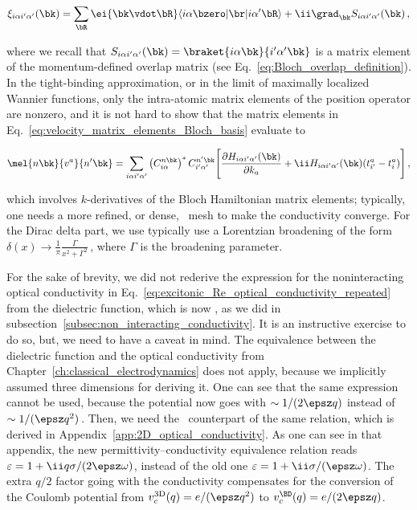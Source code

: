\begin{equation}
    \xi_{i \alpha i' \alpha'}(\bk) = \sum_{\bR} \ei{\bk \vdot \bR} \langle i \alpha \bzero | \br | i \alpha' \bR \rangle + \ii \grad_{\bk} S_{i \alpha i' \alpha '} (\bk) \,,
\end{equation}

\noindent where we recall that $S_{i \alpha i' \alpha '} (\bk) = \braket{i \alpha \bk}{i' \alpha' \bk}$ is a matrix element of the momentum-defined overlap matrix (see Eq.~\ref{eq:Bloch_overlap_definition}).
In the tight-binding approximation, or in the limit of maximally localized Wannier functions, only the intra-atomic matrix elements of the position operator are nonzero, and it is not hard to show that the matrix elements in Eq.~\ref{eq:velocity_matrix_elements_Bloch_basis} evaluate to

\begin{equation}
     \mel{n\bk}{v^{a}}{n'\bk} = \sum_{i \alpha i' \alpha'} \left(C^{n\bk}_{i\alpha}\right)^* C^{n'\bk}_{i'\alpha'}\Bigg[ \frac{\partial H_{i \alpha i' \alpha'}(\bk)}{\partial k_a} +  \ii H_{i \alpha i' \alpha'}(\bk)(t^a_{i'} - t^a_{i})\Bigg] \,,
\end{equation}

\noindent which involves $k$-derivatives of the Bloch Hamiltonian matrix elements; typically, one needs a more refined, or dense, \bz~mesh to make the conductivity converge.
For the Dirac delta part, we use typically use a Lorentzian broadening of the form $\delta (x) \to \frac{1}{\pi} \frac{\Gamma}{x^2 + \Gamma^2}$\,, where $\Gamma$ is the broadening parameter.

For the sake of brevity, we did not rederive the expression for the noninteracting optical conductivity in Eq.~\eqref{eq:excitonic_Re_optical_conductivity_repeated} from the dielectric function, which is now \bd, as we did in subsection~\eqref{subsec:non_interacting_conductivity}.
It is an instructive exercise to do so, but, we need to have a caveat in mind.
The equivalence between the dielectric function and the optical conductivity from Chapter~\ref{ch:classical_electrodynamics} does not apply, because we implicitly assumed three dimensions for deriving it.
One can see that the same expression cannot be used, because the potential now goes with $\sim 1/(2\epsz q)$ instead of $\sim 1/(\epsz q^2)$\,.
Then, we need the \bd~counterpart of the same relation, which is derived in Appendix~\ref{app:2D_optical_conductivity}.
As one can see in that appendix, the new permittivity--conductivity equivalence relation reads $\varepsilon = 1 + \ii q \sigma / (2 \epsz \omega)$, instead of the old one $\varepsilon = 1 + \ii \sigma / (\epsz \omega)$.
The extra $q/2$ factor going with the conductivity compensates for the conversion of the Coulomb potential from $v^{\mathrm{3D}}_c(q) = e/(\epsz q^2) $ to $ v^{\BD}_c(q) = e/(2\epsz q)$.


